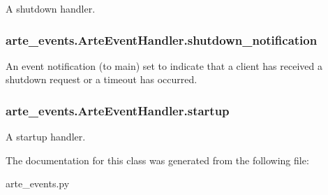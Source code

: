 A shutdown handler. 

\subsubsection[{shutdown\+\_\+notification}]{\setlength{\rightskip}{0pt plus 5cm}arte\+\_\+events.\+Arte\+Event\+Handler.\+shutdown\+\_\+notification}\label{classarte__events_1_1_arte_event_handler_a700abfec6c03df636eb76be12d92c2c1}


An event notification (to main) set to indicate that a client has received a shutdown request or a timeout has occurred. 

\subsubsection[{startup}]{\setlength{\rightskip}{0pt plus 5cm}arte\+\_\+events.\+Arte\+Event\+Handler.\+startup}\label{classarte__events_1_1_arte_event_handler_a05bee1005609e7a70c28962b7baed13f}


A startup handler. 



The documentation for this class was generated from the following file\+:\begin{DoxyCompactItemize}
\item 
arte\+\_\+events.\+py\end{DoxyCompactItemize}
